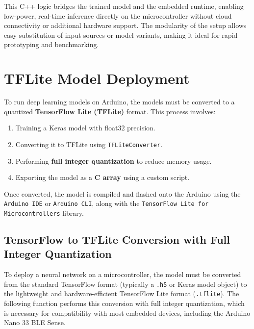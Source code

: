 This C++ logic bridges the trained model and the embedded runtime, enabling low-power, real-time inference directly on the microcontroller without cloud connectivity or additional hardware support. The modularity of the setup allows easy substitution of input sources or model variants, making it ideal for rapid prototyping and benchmarking.





\section{TFLite Model Deployment}

To run deep learning models on Arduino, the models must be converted to a quantized \textbf{TensorFlow Lite (TFLite)} format. This process involves:

\begin{enumerate}
\item Training a Keras model with float32 precision.
\item Converting it to TFLite using \texttt{TFLiteConverter}.
\item Performing \textbf{full integer quantization} to reduce memory usage.
\item Exporting the model as a \textbf{C array} using a custom script.
\end{enumerate}

Once converted, the model is compiled and flashed onto the Arduino using the \texttt{Arduino IDE} or \texttt{Arduino CLI}, along with the \texttt{TensorFlow Lite for Microcontrollers} library.




\clearpage


\subsection{TensorFlow to TFLite Conversion with Full Integer Quantization}

To deploy a neural network on a microcontroller, the model must be converted from the standard TensorFlow format (typically a \texttt{.h5} or Keras model object) to the lightweight and hardware-efficient TensorFlow Lite format (\texttt{.tflite}). The following function performs this conversion with full integer quantization, which is necessary for compatibility with most embedded devices, including the Arduino Nano 33 BLE Sense.

